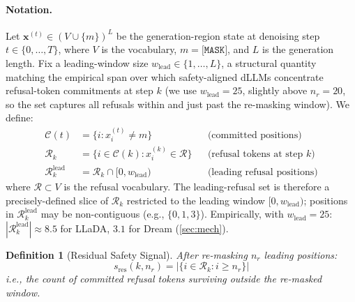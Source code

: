 \documentclass{article}
\theoremstyle{coloredthm}
\newtheorem{definition}{Definition}
\newcommand{\dllms}{dLLMs}
\newcommand{\maskid}{\texttt{[MASK]}}
\begin{document}
\paragraph{Notation.} Let $\mathbf{x}^{(t)} \in (V \cup \{m\})^L$ be the generation-region state at denoising step $t \in \{0, \ldots, T\}$, where $V$ is the vocabulary, $m = \maskid{}$, and $L$ is the generation length. Fix a leading-window size $w_{\text{lead}} \in \{1, \ldots, L\}$, a structural quantity matching the empirical span over which safety-aligned \dllms{} concentrate refusal-token commitments at step $k$ (we use $w_{\text{lead}} = 25$, slightly above $n_r = 20$, so the set captures all refusals within and just past the re-masking window). We define:
\begin{align}
\mathcal{C}(t) &= \{i : x^{(t)}_i \neq m\} && \text{(committed positions)} \\
\mathcal{R}_k &= \{i \in \mathcal{C}(k) : x^{(k)}_i \in \mathcal{R}\} && \text{(refusal tokens at step $k$)} \\
\mathcal{R}^{\text{lead}}_k &= \mathcal{R}_k \cap [0, w_{\text{lead}}) && \text{(leading refusal positions)}
\end{align}
where $\mathcal{R} \subset V$ is the refusal vocabulary. The leading-refusal set is therefore a precisely-defined slice of $\mathcal{R}_k$ restricted to the leading window $[0, w_{\text{lead}})$; positions in $\mathcal{R}^{\text{lead}}_k$ may be non-contiguous (e.g., $\{0, 1, 3\}$). Empirically, with $w_{\text{lead}} = 25$: $|\mathcal{R}^{\text{lead}}_k| \approx 8.5$ for LLaDA, $3.1$ for Dream (\cref{sec:mech}).

\begin{definition}[Residual Safety Signal]
After re-masking $n_r$ leading positions:
\begin{equation}
s_{\text{res}}(k, n_r) = |\{i \in \mathcal{R}_k : i \geq n_r\}|
\end{equation}
i.e., the count of committed refusal tokens surviving outside the re-masked window.
\end{definition}
\end{document}
